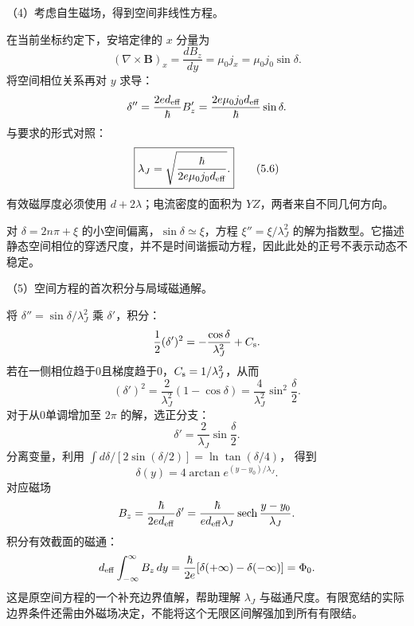 \documentclass[12pt,a4paper,fontset=fandol]{ctexart}
\begin{document}
\begin{center}
\begin{minipage}{\linewidth}
\centering\begingroup
{}
\ifdim\wd\diagrambox>.88\linewidth
\sbox{\diagrambox}{\resizebox{.88\linewidth}{!}{\usebox{\diagrambox}}}
\fi
\ifdim\ht\diagrambox>.40\textheight
\resizebox{!}{.40\textheight}{\usebox{\diagrambox}}
\else\usebox{\diagrambox}\fi
\par{}
\endgroup\end{minipage}
\end{center}

（4）考虑自生磁场，得到空间非线性方程。

在当前坐标约定下，安培定律的 \(x\) 分量为 \[
(\nabla\times\mathbf B)_x=\frac{dB_z}{dy}
=\mu_0j_x=\mu_0j_0\sin\delta.
\] 将空间相位关系再对 \(y\) 求导： \[
\delta''=\frac{2ed_{\rm eff}}{\hbar}B_z'
=\frac{2e\mu_0j_0d_{\rm eff}}{\hbar}\sin\delta.
\] 与要求的形式对照： \[
\boxed{\lambda_J=
\sqrt{\frac{\hbar}{2e\mu_0j_0d_{\rm eff}}}.}\tag{5.6}
\] 有效磁厚度必须使用 \(d+2\lambda\)；电流密度的面积为
\(YZ\)，两者来自不同几何方向。

对 \(\delta=2n\pi+\xi\) 的小空间偏离，\(\sin\delta\simeq\xi\)，方程
\(\xi''=\xi/\lambda_J^2\)
的解为指数型。它描述静态空间相位的穿透尺度，并不是时间谐振动方程，因此此处的正号不表示动态不稳定。

（5）空间方程的首次积分与局域磁通解。

将 \(\delta''=\sin\delta/\lambda_J^2\) 乘 \(\delta'\)，积分： \[
\frac12(\delta')^2=-\frac{\cos\delta}{\lambda_J^2}+C_{\rm s}.
\] 若在一侧相位趋于0且梯度趋于0，\(C_{\rm s}=1/\lambda_J^2\)，从而 \[
(\delta')^2=\frac{2}{\lambda_J^2}(1-\cos\delta)
=\frac4{\lambda_J^2}\sin^2\frac\delta2.
\] 对于从0单调增加至 \(2\pi\) 的解，选正分支： \[
\delta'=\frac2{\lambda_J}\sin\frac\delta2.
\] 分离变量，利用 \(\int d\delta/[2\sin(\delta/2)]=\ln\tan(\delta/4)\)，
得到 \[
\delta(y)=4\arctan e^{(y-y_0)/\lambda_J}.
\] 对应磁场 \[
B_z=\frac{\hbar}{2ed_{\rm eff}}\delta'
=\frac{\hbar}{ed_{\rm eff}\lambda_J}
\operatorname{sech}\frac{y-y_0}{\lambda_J}.
\] 积分有效截面的磁通： \[
d_{\rm eff}\int_{-\infty}^{\infty}B_z\,dy
=\frac{\hbar}{2e}[\delta(+\infty)-\delta(-\infty)]
=\Phi_0.
\] 这是原空间方程的一个补充边界值解，帮助理解 \(\lambda_J\)
与磁通尺度。有限宽结的实际边界条件还需由外磁场决定，不能将这个无限区间解强加到所有有限结。
\end{document}
